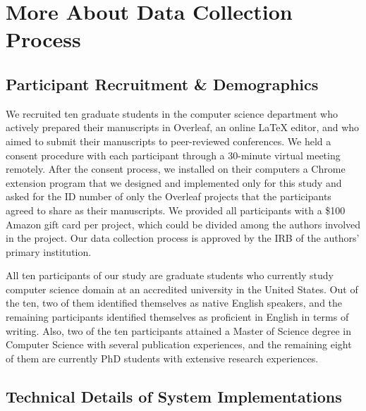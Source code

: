 \newpage
\clearpage
\section{More About Data Collection Process}
\subsection{Participant Recruitment \& Demographics} \label{sec:appendix:recruitment}

We recruited ten graduate students in the computer science department who actively prepared their manuscripts in Overleaf, an online \LaTeX{} editor, and who aimed to submit their manuscripts to peer-reviewed conferences. We held a consent procedure with each participant through a 30-minute virtual meeting remotely.  After the consent process, we installed on their computers a Chrome extension program that we designed and implemented only for this study and asked for the ID number of only the Overleaf projects that the participants agreed to share as their manuscripts. 
We provided all participants with a \$100 Amazon gift card per project, which could be divided among the authors involved in the project. Our data collection process is approved by the IRB of the authors' primary institution. 

All ten participants of our study are graduate students who currently study computer science domain at an accredited university in the United States. Out of the ten, two of them identified themselves as native English speakers, and the remaining participants identified themselves as proficient in English in terms of writing. Also, two of the ten participants attained a Master of Science degree in Computer Science with several publication experiences, and the remaining eight of them are currently PhD students with extensive research experiences. 

\subsection{Technical Details of System Implementations} \label{sec:appendix:system} 

